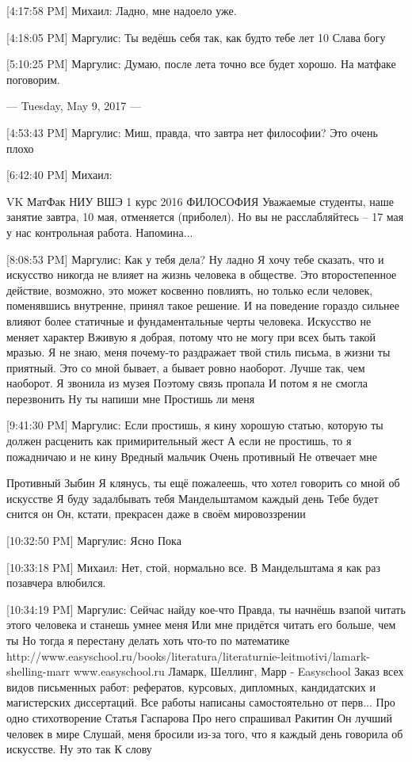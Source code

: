 \documentclass{article}
\begin{document}
[4:17:58 PM] Михаил:
Ладно, мне надоело уже.

[4:18:05 PM] Маргулис:
Ты ведёшь себя так, как будто тебе лет 10
 Слава богу

[5:10:25 PM] Маргулис:
Думаю, после лета точно все будет хорошо.
 На матфаке поговорим.

--- Tuesday, May 9, 2017 ---

[4:53:43 PM] Маргулис:
Миш, правда, что завтра нет философии?
 Это очень плохо

[6:42:40 PM] Михаил:

VK
МатФак НИУ ВШЭ 1 курс 2016
ФИЛОСОФИЯ Уважаемые студенты, наше занятие завтра, 10 мая, отменяется (приболел). Но вы не расслабляйтесь – 17 мая у нас контрольная работа. Напомина...

[8:08:53 PM] Маргулис:
Как у тебя дела?
 Ну ладно
 Я хочу тебе сказать, что и искусство никогда не влияет на жизнь человека в обществе. Это второстепенное действие, возможно, это может косвенно повлиять, но только если человек, поменявшись внутренне, принял такое решение.
 И на поведение гораздо сильнее влияют более статичные и фундаментальные черты человека.
 Искусство не меняет характер
 Вживую я добрая, потому что не могу при всех быть такой мразью.
 Я не знаю, меня почему-то раздражает твой стиль письма, в жизни ты приятный. Это со мной бывает, а бывает ровно наоборот. Лучше так, чем наоборот.
 Я звонила из музея
 Поэтому связь пропала
 И потом я не смогла перезвонить
 Ну ты напиши мне
 Простишь ли меня

[9:41:30 PM] Маргулис:
Если простишь, я кину хорошую статью, которую ты должен расценить как примирительный жест
 А если не простишь, то я пожадничаю и не кину
 Вредный мальчик
 Очень противный
 Не отвечает мне
 

 
 Противный Зыбин
 Я клянусь, ты ещё пожалеешь, что хотел говорить со мной об искусстве
 Я буду задалбывать тебя Мандельштамом каждый день
 Тебе будет снится он
 Он, кстати, прекрасен даже в своём мировоззрении

[10:32:50 PM] Маргулис:
Ясно
 Пока

[10:33:18 PM] Михаил:
Нет, стой, нормально все.
 В Мандельштама я как раз позавчера влюбился.

[10:34:19 PM] Маргулис:
Сейчас найду кое-что
 Правда, ты начнёшь взапой читать этого человека и станешь умнее меня
 Или мне придётся читать его больше, чем ты
 Но тогда я перестану делать хоть что-то по математике
 http://www.easyschool.ru/books/literatura/literaturnie-leitmotivi/lamark-shelling-marr
www.easyschool.ru
Ламарк, Шеллинг, Марр - Easyschool
Заказ всех видов письменных работ: рефератов, курсовых, дипломных, кандидатских и магистерских диссертаций. Все работы написаны самостоятельно от перв...
 Про одно стихотворение
 Статья Гаспарова
 Про него спрашивал Ракитин
 Он лучший человек в мире
 Слушай, меня бросили из-за того, что я каждый день говорила об искусстве.
 Ну это так
 К слову
\end{document}
